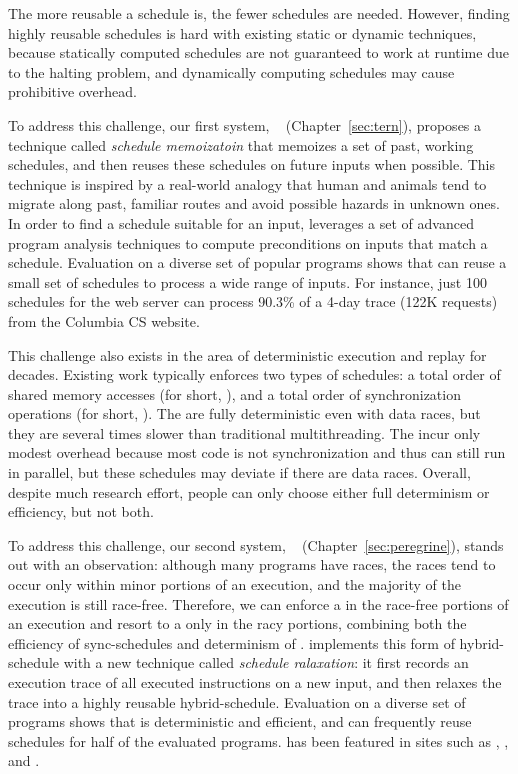  The more reusable a schedule is, the fewer schedules are needed.
However, finding highly reusable schedules is hard with existing static or
dynamic techniques, because statically computed schedules are not guaranteed to
work at runtime due to the halting problem, and dynamically computing schedules
may cause prohibitive overhead.

To address this challenge, our first \smt system, \tern~\cite{cui:tern:osdi10}
(Chapter~\ref{sec:tern}), proposes a technique called \emph{schedule
memoizatoin} that memoizes a set of past, working schedules, and then reuses
these schedules on future inputs when possible. This technique is inspired by a
real-world analogy that human and animals tend to migrate along past, familiar
routes and avoid possible hazards in unknown ones. In order to find a schedule
suitable for an input, \tern leverages a set of advanced program analysis
techniques to compute preconditions on inputs that match a schedule. Evaluation
on a diverse set of popular programs shows that \tern can reuse a small set of
schedules to process a wide range of inputs. For instance, just 100 schedules
for the \apache web server can process 90.3\% of a 4-day trace (122K requests)
from the Columbia CS website.

 This challenge also exists in the area of deterministic
execution and replay for decades. Existing work typically enforces two types of
schedules: a total order of shared memory accesses (for short, \memsched), and a
total order of synchronization operations (for short, \syncsched). The
\memscheds are fully deterministic even with data races, but they are several
times slower than traditional multithreading. The \syncscheds incur only modest
overhead because most code is not synchronization and thus can still run in
parallel, but these schedules may deviate if there are data races. Overall,
despite much research effort, people can only choose either full determinism or
efficiency, but not both.

To address this challenge, our second \smt system,
\peregrine~\cite{peregrine:sosp11} (Chapter~\ref{sec:peregrine}), stands out
with an observation: although many programs have races, the races tend to occur
only within minor portions of an execution, and the majority of the execution is
still race-free. Therefore, we can enforce a \syncscheds in the race-free
portions of an execution and resort to a \memsched only in the racy portions,
combining both the efficiency of sync-schedules and determinism of \memscheds. 
\peregrine implements this form of hybrid-schedule with a new technique called
\emph{schedule ralaxation}: it first records an execution trace of
all executed instructions on a new input, and then relaxes the trace into a
highly reusable hybrid-schedule. Evaluation on a diverse set of programs shows
that \peregrine is deterministic and efficient, and can frequently reuse
schedules for half of the evaluated programs. \peregrine has been featured in
sites such as \acmtechnews, \tgdaily, and \physorg.


